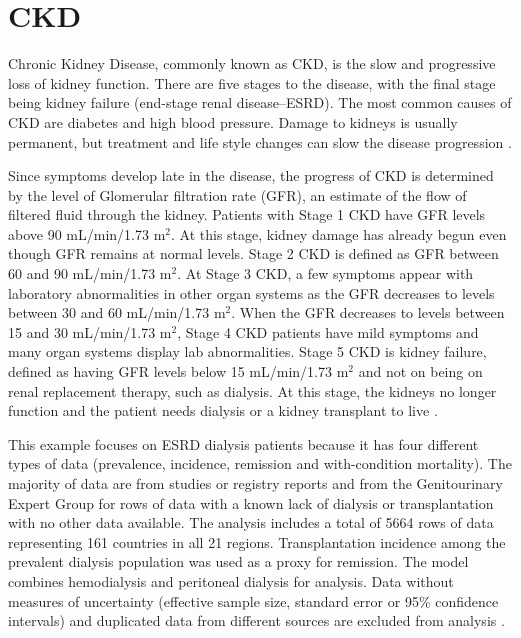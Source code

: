 \chapter{CKD}
\label{applications-fits_incon_v_con}

Chronic Kidney Disease, commonly known as CKD, is the slow and progressive loss of kidney function. There are five stages to the disease, with the final stage being kidney failure (end-stage renal disease--ESRD). The most common causes of CKD are diabetes and high blood pressure.  Damage to kidneys is usually permanent, but treatment and life style changes can slow the disease progression \cite{national_about_2012, american_chronic_2010}.

Since symptoms develop late in the disease, the progress of CKD is determined by the level of Glomerular filtration rate (GFR), an estimate of the flow of filtered fluid through the kidney. Patients with Stage 1 CKD have GFR levels above 90 mL/min/1.73 m$^2$.  At this stage, kidney damage has already begun even though GFR remains at normal levels.   Stage 2 CKD is defined as GFR between 60 and 90 mL/min/1.73 m$^2$.  At Stage 3 CKD, a few symptoms appear with laboratory abnormalities in other organ systems as the GFR decreases to levels between 30 and 60 mL/min/1.73 m$^2$.  When the GFR decreases to levels between 15 and 30 mL/min/1.73 m$^2$, Stage 4 CKD patients have mild symptoms and many organ systems display lab abnormalities.  Stage 5 CKD is kidney failure, defined as having GFR levels below 15 mL/min/1.73 m$^2$ and not on being on renal replacement therapy, such as dialysis.  At this stage, the kidneys no longer function and the patient needs dialysis or a kidney transplant to live \cite{national_about_2012, american_chronic_2010, national_KDOQI_2002}.

This example focuses on ESRD dialysis patients because it has four different types of data (prevalence, incidence, remission and with-condition mortality).  The majority of data are from studies or registry reports and from the Genitourinary Expert Group for rows of data with a known lack of dialysis or transplantation with no other data available.  The analysis includes a total of 5664 rows of data representing 161 countries in all 21 regions. Transplantation incidence among the prevalent dialysis population was used as a proxy for remission.  The model combines hemodialysis and peritoneal dialysis for analysis.  Data without measures of uncertainty (effective sample size, standard error or 95\% confidence intervals) and duplicated data from different sources are excluded from analysis \cite{wulf_2010_2012}.

